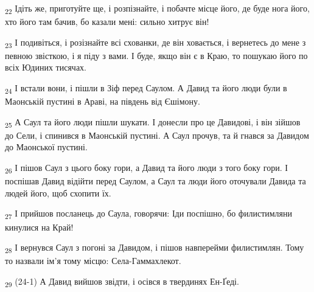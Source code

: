 \begin{tcolorbox}
\textsubscript{22} Ідіть же, приготуйте ще, і розпізнайте, і побачте місце його, де буде нога його, хто його там бачив, бо казали мені: сильно хитрує він!
\end{tcolorbox}
\begin{tcolorbox}
\textsubscript{23} І подивіться, і розізнайте всі схованки, де він ховається, і вернетесь до мене з певною звісткою, і я піду з вами. І буде, якщо він є в Краю, то пошукаю його по всіх Юдиних тисячах.
\end{tcolorbox}
\begin{tcolorbox}
\textsubscript{24} І встали вони, і пішли в Зіф перед Саулом. А Давид та його люди були в Маонській пустині в Араві, на південь від Єшімону.
\end{tcolorbox}
\begin{tcolorbox}
\textsubscript{25} А Саул та його люди пішли шукати. І донесли про це Давидові, і він зійшов до Сели, і спинився в Маонській пустині. А Саул прочув, та й гнався за Давидом до Маонської пустині.
\end{tcolorbox}
\begin{tcolorbox}
\textsubscript{26} І пішов Саул з цього боку гори, а Давид та його люди з того боку гори. І поспішав Давид відійти перед Саулом, а Саул та люди його оточували Давида та людей його, щоб схопити їх.
\end{tcolorbox}
\begin{tcolorbox}
\textsubscript{27} І прийшов посланець до Саула, говорячи: Іди поспішно, бо филистимляни кинулися на Край!
\end{tcolorbox}
\begin{tcolorbox}
\textsubscript{28} І вернувся Саул з погоні за Давидом, і пішов навперейми филистимлян. Тому то назвали ім'я тому місцю: Села-Гаммахлекот.
\end{tcolorbox}
\begin{tcolorbox}
\textsubscript{29} (24-1) А Давид вийшов звідти, і осівся в твердинях Ен-Ґеді.
\end{tcolorbox}
